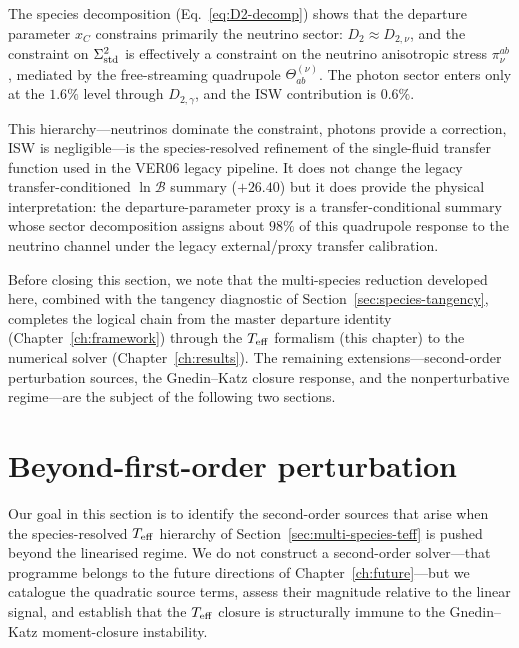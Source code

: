 The species decomposition
(Eq.~\ref{eq:D2-decomp}) shows that the
departure parameter $x_C$ constrains primarily the
neutrino sector: $D_2 \approx D_{2,\nu}$, and the
constraint on $\Sigma^2_{\mathrm{std}}$ is effectively a constraint
on the neutrino anisotropic stress
$\pi_\nu^{ab}$, mediated by the free-streaming
quadrupole $\Theta^{(\nu)}_{ab}$.  The photon
sector enters only at the $1.6\%$ level through
$D_{2,\gamma}$, and the ISW contribution is
$0.6\%$.

This hierarchy---neutrinos dominate the constraint,
photons provide a correction, ISW is
negligible---is the species-resolved refinement of
the single-fluid transfer function used in the VER06
legacy pipeline.  It does not change the legacy
transfer-conditioned $\ln \mathcal{B}$ summary
($+26.40$) but it
does provide the physical interpretation: the
departure-parameter proxy is a transfer-conditional
summary whose sector decomposition assigns about
$98\%$ of this quadrupole response to the neutrino
channel under the legacy external/proxy transfer
calibration.

Before closing this section, we note that the
multi-species reduction developed here, combined
with the tangency diagnostic of
Section~\ref{sec:species-tangency}, completes the
logical chain from the master departure identity
(Chapter~\ref{ch:framework}) through the $T_{\mathrm{eff}}$
formalism (this chapter) to the numerical solver
(Chapter~\ref{ch:results}).  The remaining
extensions---second-order perturbation sources,
the Gnedin--Katz closure response, and the
nonperturbative regime---are the subject of the
following two sections.




\section{Beyond-first-order perturbation}
\label{sec:beyond-first-order}

Our goal in this section is to identify the second-order
sources that arise when the species-resolved $T_{\mathrm{eff}}$
hierarchy of Section~\ref{sec:multi-species-teff} is pushed
beyond the linearised regime.  We do not construct a
second-order solver---that programme belongs to the future
directions of Chapter~\ref{ch:future}---but we catalogue the
quadratic source terms, assess their magnitude relative to
the linear signal, and establish that the $T_{\mathrm{eff}}$ closure
is structurally immune to the Gnedin--Katz moment-closure
instability.


